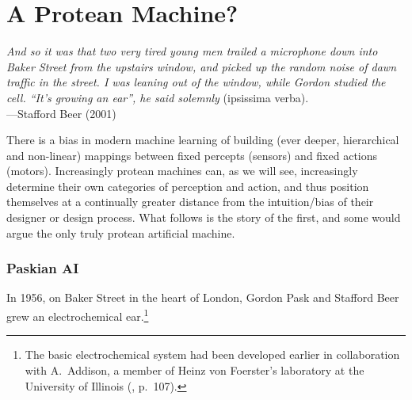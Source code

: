



\section{A Protean Machine?}

\begin{changemargin}{4em}{4em} 

\vspace{1em}

\textit{And so it was that two very tired young men trailed a microphone down into Baker Street from the upstairs window, and picked up the random noise of dawn traffic in the street. 
I was leaning out of the window, while Gordon studied the cell. 
``It's growing an ear'', he said solemnly} (ipsissima verba). \\[1em]
\hspace*{16.5em} ---Stafford Beer (2001)

\vspace{1em}

\end{changemargin}



\noindent
There is a bias in modern machine learning of building (ever deeper, hierarchical and non-linear) mappings between fixed percepts (sensors) and fixed actions (motors).
Increasingly protean machines 
can, as we will see, increasingly determine their own categories of perception and action, and thus
position themselves at a
continually greater distance from the intuition/bias of their designer or design process.
What follows is the story of the first, and some would argue the only truly protean artificial machine.


\subsubsection{Paskian AI}

In 1956, on Baker Street in the heart of London,
Gordon Pask and Stafford Beer grew an electrochemical ear.\footnote{%
The basic electrochemical system had been developed earlier in collaboration with A.~Addison,
a member of Heinz von Foerster's laboratory at the University of Illinois
(\cite{pask1961approach}, p.~107).
}

